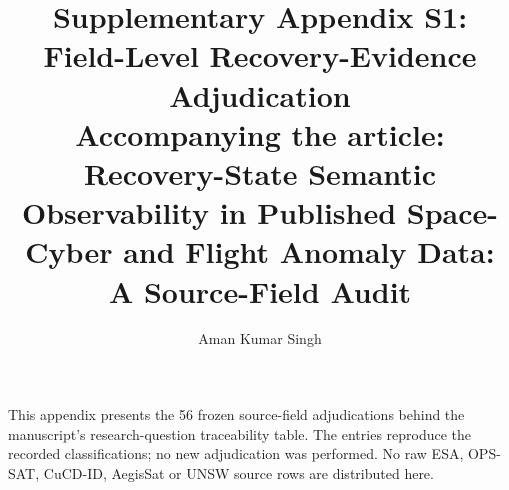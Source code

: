 \documentclass[11pt]{article}
\title{Supplementary Appendix S1: Field-Level Recovery-Evidence Adjudication\\
\large Accompanying the article: Recovery-State Semantic Observability in Published Space-Cyber and Flight Anomaly Data: A Source-Field Audit}
\author{Aman Kumar Singh}
\date{}
\begin{document}
\maketitle
\noindent This appendix presents the 56 frozen source-field adjudications behind the manuscript's research-question traceability table. The entries reproduce the recorded classifications; no new adjudication was performed. No raw ESA, OPS-SAT, CuCD-ID, AegisSat or UNSW source rows are distributed here.

\end{document}
